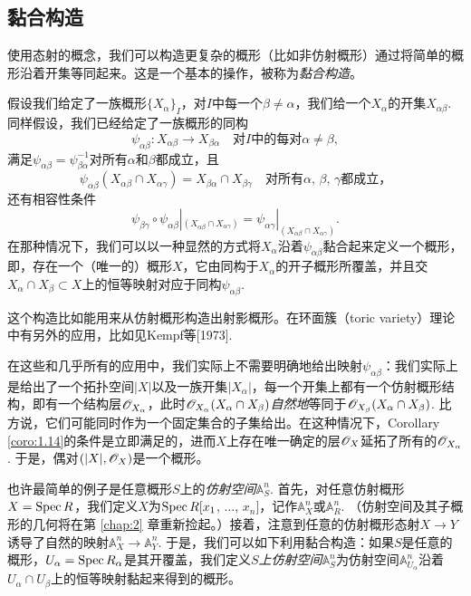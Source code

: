 \subsection{黏合构造}

使用态射的概念，我们可以构造更复杂的概形（比如非仿射概形）通过将简单的概形沿着开集等同起来。这是一个基本的操作，被称为\textit{黏合构造}。

假设我们给定了一族概形$\{X_\alpha\}_I$，对$I$中每一个$\beta\neq \alpha$，我们给一个$X_\alpha$的开集$X_{\alpha\beta}$. 同样假设，我们已经给定了一族概形的同构
\[
	\psi_{\alpha\beta}:X_{\alpha\beta}\to X_{\beta\alpha}\quad \text{对$I$中的每对$\alpha\neq \beta$},
\]
满足$\psi_{\alpha\beta}=\psi_{\beta\alpha}^{-1}$对所有$\alpha$和$\beta$都成立，且
\[
	\psi_{\alpha\beta}(X_{\alpha\beta}\cap X_{\alpha\gamma})=X_{\beta\alpha}\cap X_{\beta\gamma}\quad \text{对所有$\alpha$, $\beta$, $\gamma$都成立，}
\]
还有相容性条件
\[
	\psi_{\beta\gamma}\circ \psi_{\alpha\beta}|_{(X_{\alpha\beta}\cap X_{\alpha\gamma})}=\psi_{\alpha\gamma}|_{(X_{\alpha\beta}\cap X_{\alpha\gamma})}.
\]
在那种情况下，我们可以以一种显然的方式将$X_\alpha$沿着$\psi_{\alpha\beta}$黏合起来定义一个概形，即，存在一个（唯一的）概形$X$，它由同构于$X_\alpha$的开子概形所覆盖，并且交$X_\alpha\cap X_\beta\subset X$上的恒等映射对应于同构$\psi_{\alpha\beta}$.

这个构造比如能用来从仿射概形构造出射影概形。在环面簇（toric variety）理论中有另外的应用，比如见Kempf等[1973].

在这些和几乎所有的应用中，我们实际上不需要明确地给出映射$\psi_{\alpha\beta}$：我们实际上是给出了一个拓扑空间$|X|$以及一族开集$|X_\alpha|$，每一个开集上都有一个仿射概形结构，即有一个结构层$\mathscr{O}_{X_\alpha}$，此时$\mathscr{O}_{X_\alpha}(X_\alpha\cap X_\beta)$\textit{自然地}等同于$\mathscr{O}_{X_\beta}(X_\alpha\cap X_\beta)$. 比方说，它们可能同时作为一个固定集合的子集给出。在这种情况下，Corollary \ref{coro:1.14}的条件是立即满足的，进而$X$上存在唯一确定的层$\mathscr{O}_X$延拓了所有的$\mathscr{O}_{X_\alpha}$. 于是，偶对$(|X|,\mathscr{O}_X)$是一个概形。

也许最简单的例子是任意概形$S$上的\textit{仿射空间}$\mathbb{A}^n_S$. 首先，对任意仿射概形$X=\operatorname{Spec} R$，我们定义$X$为$\operatorname{Spec} R[x_1$, $\dots$, $x_n]$，记作$\mathbb{A}_X^n$或$\mathbb{A}_R^n$. （仿射空间及其子概形的几何将在第 \ref{chap:2} 章重新捡起。）接着，注意到任意的仿射概形态射$X\to Y$诱导了自然的映射$\mathbb{A}_X^n\to \mathbb{A}_Y^n$. 于是，我们可以如下利用黏合构造：如果$S$是任意的概形，$U_\alpha=\operatorname{Spec} R_\alpha$是其开覆盖，我们定义\textit{$S$上仿射空间$\mathbb{A}_S^n$}为仿射空间$\mathbb{A}_{U_\alpha}^n$沿着$U_\alpha\cap U_\beta$上的恒等映射黏起来得到的概形。

